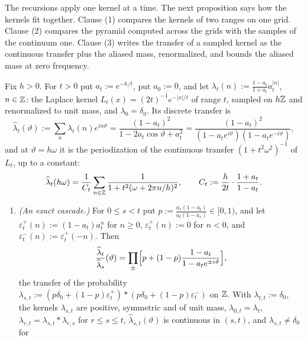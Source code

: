 The recursions apply one kernel at a time. The next proposition says how the kernels fit together.
Clause (1) compares the kernels of two ranges on one grid. Clause (2) compares the pyramid computed
across the grids with the samples of the continuum one. Clause (3) writes the transfer of a sampled
kernel as the continuous transfer plus the aliased mass, renormalized, and bounds the aliased mass
at zero frequency.

\begin{proposition}
\label{prop:sampled-laplace-exact}

Fix $h > 0$. For $t > 0$ put $a_t := e^{-h/t}$, put $a_0 := 0$, and let
$\lambda_t(n) := \tfrac{1-a_t}{1+a_t}a_t^{|n|}$, $n \in \mathbb{Z}$: the Laplace kernel
$L_t(x) = (2t)^{-1}e^{-|x|/t}$ of range $t$, sampled on $h\mathbb{Z}$ and renormalized to unit mass, and
$\lambda_0 = \delta_0$. Its discrete transfer is
\begin{equation}
\label{eq:sampled-laplace-transfer}
  \widehat\lambda_t(\vartheta) := \sum_n\lambda_t(n)e^{in\vartheta}
  = \frac{(1-a_t)^2}{1 - 2a_t\cos\vartheta + a_t^2}
  = \frac{(1-a_t)^2}{(1 - a_te^{i\vartheta})(1 - a_te^{-i\vartheta})} ,
\end{equation}
and at $\vartheta = h\omega$ it is the periodization of the continuous transfer
$(1 + t^2\omega^2)^{-1}$ of $L_t$, up to a constant:
\[
  \widehat\lambda_t(h\omega) = \frac{1}{C_t}\sum_{n \in \mathbb{Z}}\frac{1}{1 + t^2(\omega + 2\pi n/h)^2},
  \qquad C_t := \frac{h}{2t}\cdot\frac{1 + a_t}{1 - a_t} .
\]
\begin{enumerate}
\item \emph{(An exact cascade.)} For $0 \le s < t$ put
$p := \tfrac{a_s(1-a_t)}{a_t(1-a_s)} \in [0,1)$, and let $\varepsilon^+_t(n) := (1-a_t)a_t^n$ for $n \ge 0$,
$\varepsilon^+_t(n) := 0$ for $n < 0$, and $\varepsilon^-_t(n) := \varepsilon^+_t(-n)$. Then
\begin{equation}
\label{eq:sampled-laplace-increment}
  \frac{\widehat\lambda_t}{\widehat\lambda_s}(\vartheta)
  = \prod_\pm\Bigl[p + (1-p)\frac{1 - a_t}{1 - a_te^{\pm i\vartheta}}\Bigr] ,
\end{equation}
the transfer of the probability
$\lambda_{s,t} := (p\delta_0 + (1-p)\varepsilon^+_t) * (p\delta_0 + (1-p)\varepsilon^-_t)$ on $\mathbb{Z}$. With
$\lambda_{t,t} := \delta_0$, the kernels $\lambda_{s,t}$ are positive, symmetric and of unit mass,
$\lambda_{0,t} = \lambda_t$, $\lambda_{r,t} = \lambda_{s,t} * \lambda_{r,s}$ for $r \le s \le t$,
$\widehat\lambda_{s,t}(\vartheta)$ is continuous in $(s,t)$, and $\lambda_{s,t} \ne \delta_0$ for

\end{enumerate}
\end{proposition}
